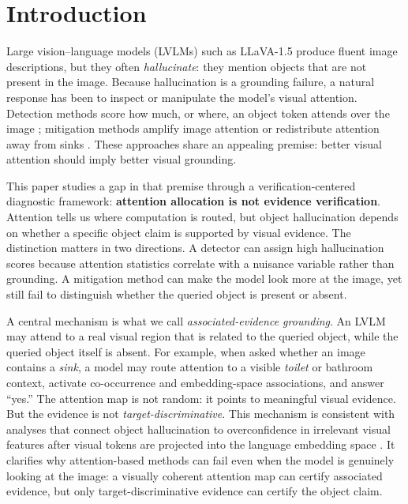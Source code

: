 \section{Introduction}

Large vision--language models (LVLMs) such as LLaVA-1.5 \cite{liu2023llava} produce fluent image descriptions, but they often \emph{hallucinate}: they mention objects that are not present in the image. Because hallucination is a grounding failure, a natural response has been to inspect or manipulate the model's visual attention. Detection methods score how much, or where, an object token attends over the image \cite{jiang2024devils,hoangxuan2026pas}; mitigation methods amplify image attention or redistribute attention away from sinks \cite{liu2024pai,yin2025clearsight,kang2025visualsink}. These approaches share an appealing premise: better visual attention should imply better visual grounding.

This paper studies a gap in that premise through a verification-centered diagnostic framework: \textbf{attention allocation is not evidence verification}. Attention tells us where computation is routed, but object hallucination depends on whether a specific object claim is supported by visual evidence. The distinction matters in two directions. A detector can assign high hallucination scores because attention statistics correlate with a nuisance variable rather than grounding. A mitigation method can make the model look more at the image, yet still fail to distinguish whether the queried object is present or absent.

A central mechanism is what we call \emph{associated-evidence grounding}. An LVLM may attend to a real visual region that is related to the queried object, while the queried object itself is absent. For example, when asked whether an image contains a \emph{sink}, a model may route attention to a visible \emph{toilet} or bathroom context, activate co-occurrence and embedding-space associations, and answer ``yes.'' The attention map is not random: it points to meaningful visual evidence. But the evidence is not \emph{target-discriminative}. This mechanism is consistent with analyses that connect object hallucination to overconfidence in irrelevant visual features after visual tokens are projected into the language embedding space \cite{bai2025adavib}. It clarifies why attention-based methods can fail even when the model is genuinely looking at the image: a visually coherent attention map can certify associated evidence, but only target-discriminative evidence can certify the object claim.

